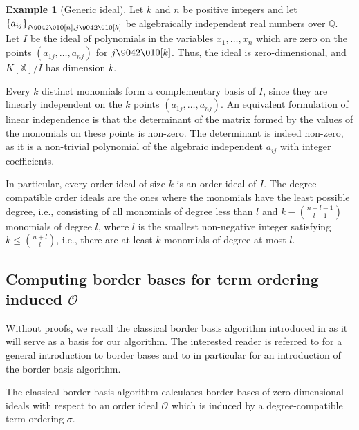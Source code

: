 \documentclass[11pt,oneside,english]{amsart}
\makeatletter
\numberwithin{equation}{section}
\numberwithin{figure}{section}
\theoremstyle{plain}
\theoremstyle{definition}
\theoremstyle{definition}
\newtheorem{example}[thm]{Example}
\theoremstyle{remark}
\theoremstyle{plain}
\theoremstyle{plain}
\theoremstyle{plain}
\theoremstyle{problem@}
\makeatother
\begin{document}
\begin{example}[Generic ideal]\label{exa:generic}
  Let \(k\) and \(n\) be positive integers and
  let \({\{a_{ij}\}}_{i {\9042\010} [n], j {\9042\010} [k]}\) be
  algebraically independent real numbers over \({\mathbb{Q}}\).
  Let \(I\) be the ideal of polynomials in the variables \(x_1,\dotsc,x_n\)
  which are zero on the points \((a_{1j}, \dotsc, a_{nj})\)
  for \(j {\9042\010} [k]\).
  Thus, the ideal is zero-dimensional, and \({K[\mathbb{X}]} / I\) has dimension \(k\).

  Every \(k\) distinct monomials form a complementary basis of \(I\),
  since they are linearly independent on the \(k\) points
  \((a_{1j}, \dotsc, a_{nj})\).
  An equivalent formulation of linear independence is that
  the determinant of the matrix formed by the values of
  the monomials on these points is non-zero.
  The determinant is indeed non-zero,
  as it is a non-trivial polynomial of the algebraic independent \(a_{ij}\)
  with integer coefficients.
  
  In particular, every order ideal of size $k$ is an order ideal of \(I\).
  The degree-compatible order ideals are the ones
  where the monomials have the least possible degree,
  i.e., consisting of
  all monomials of degree less than \(l\) and
  \(k - \binom{n+l-1}{l-1}\) monomials of degree \(l\),
  where \(l\) is the smallest non-negative integer satisfying
  \(k \leq \binom{n+l}{l}\), i.e.,
  there are at least \(k\) monomials of degree at most \(l\).
\end{example}

\subsection{\label{sub:classicBB}Computing border bases for term ordering induced
${\mathcal{O}}$}

Without proofs,
we recall the classical border basis algorithm
introduced in \cite{kehrein2006cbb} as it will serve as a basis for
our algorithm.  The interested reader is referred to
\cite{kehrein14asv,kehrein2005cbb} for a general introduction to
border bases and to \cite{kehrein2006cbb} in particular for an introduction
of the border basis algorithm.

The classical border basis algorithm
calculates border bases of zero-dimensional ideals with
respect to an order ideal ${\mathcal{O}}$ which is induced by a degree-compatible
term ordering $\sigma$.
\end{document}
